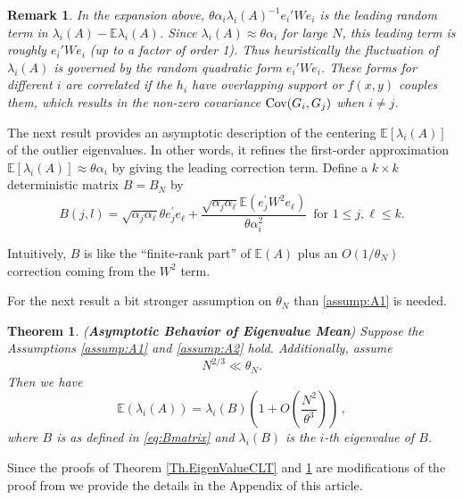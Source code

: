 \documentclass[11pt, reqno]{amsart}
\numberwithin{equation}{section}
\newtheorem{theorem}{Theorem}[section]
\newtheorem{remark}{Remark}[section]
\newcommand{\E}{\mbox{${\mathbb E}$}}
\def\Cov{{\rm Cov}}
\begin{document}
\medskip
\begin{remark} In the expansion above, $\theta \alpha_i\lambda_i(A)^{-1} e_i' W e_i$ is the leading random term in $\lambda_i(A) - \E\lambda_i(A)$. Since $\lambda_i(A) \approx \theta \alpha_i$ for large $N$, this leading term is roughly $e_i' W e_i$ (up to a factor of order 1). Thus heuristically the fluctuation of $\lambda_i(A)$ is governed by the random quadratic form $e_i' W e_i$. These forms for different $i$ are correlated if the $h_i$ have overlapping support or $f(x,y)$ couples them, which results in the non-zero covariance $\Cov(G_i,G_j)$ when $i\neq j$. 
\end{remark}

The next result provides an asymptotic description of the centering $\mathbb{E}[\lambda_i(A)]$ of the outlier eigenvalues. In other words, it refines the first-order approximation $\mathbb{E}[\lambda_i(A)] \approx \theta \alpha_i$ by giving the leading correction term. Define a $k\times k$ deterministic matrix $B = B_N$ by
\begin{equation}\label{eq:Bmatrix}
B(j,l) = \sqrt{\alpha_j \alpha_{\ell}} \theta e_j^\prime e_{\ell} + \frac{\sqrt{\alpha_j \alpha_{\ell}} \mathbb E(e_j^\prime W^2 e_{\ell})}{\theta \alpha_i^2}\, \text{ for } 1\le j,\ell \le k.
\end{equation}

Intuitively, $B$ is like the “finite-rank part” of $\E(A)$ plus an $O(1/\theta_N)$ correction coming from the $W^2$ term.

For the next result a bit stronger assumption on $\theta_N$ than \ref{assump:A1} is needed.


\begin{theorem}\label{Th.EigenValueMean} ({\bf Asymptotic Behavior of Eigenvalue Mean}) Suppose the  Assumptions \ref{assump:A1} and \ref{assump:A2} hold.  Additionally, assume \begin{equation}\label{assump:A4}
N^{2/3} \ll \theta_N.
\end{equation} 
Then we have
\[
\mathbb E (\lambda_i(A)) = \lambda_i(B)\left(1 + O \left(\frac{N^2}{\theta^3}\right)\right)\,,
\]
where $B$ is as defined in \eqref{eq:Bmatrix} and $\lambda_i(B)$ is the $i$-th eigenvalue of $B$.
\end{theorem}

Since the proofs of Theorem \ref{Th.EigenValueCLT} and \ref{Th.EigenValueMean} are modifications of the proof from \cite{chakrabarty2020eigenvalues} we provide the details in the Appendix of this article.
\end{document}
